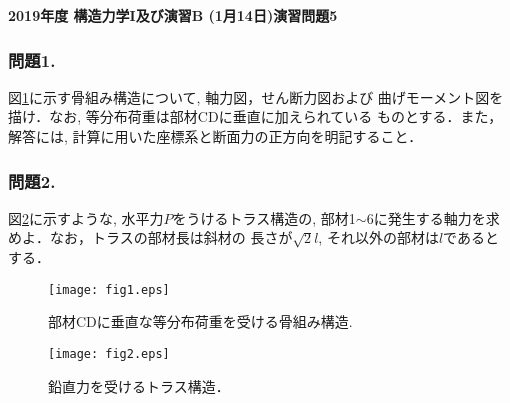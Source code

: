 \documentclass[10pt,a4j]{jarticle}
\newlength{\minitwocolumn}
\begin{document}
\newcommand{\fat}[1]{\mbox{\boldmath $#1$}}
\newcommand{\D}{\partial}
\newcommand{\w}{\omega}
\newcommand{\ga}{\alpha}
\newcommand{\gb}{\beta}
\newcommand{\gx}{\xi}
\newcommand{\gz}{\zeta}
\newcommand{\vhat}[1]{\hat{\fat{#1}}}
\newcommand{\spc}{\vspace{0.7\baselineskip}}
\newcommand{\halfspc}{\vspace{0.3\baselineskip}}

\pagestyle{empty}
\newcommand{\twofig}[2]
 {
   \begin{figure}[h]
     \begin{minipage}[t]{\minitwocolumn}
         \begin{center}   #1
         \end{center}
     \end{minipage}
         \hspace{\columnsep}
     \begin{minipage}[t]{\minitwocolumn}
         \begin{center} #2
         \end{center}
     \end{minipage}
   \end{figure}
 }
\begin{center}
{\Large \bf 2019年度 構造力学I及び演習B (1月14日)演習問題5} \\
\end{center}
\subsubsection*{問題1.}
図\ref{fig:fig1}に示す骨組み構造について, 軸力図，せん断力図および
曲げモーメント図を描け．なお, 等分布荷重は部材CDに垂直に加えられている
ものとする．また，解答には, 計算に用いた座標系と断面力の正方向を明記すること．
\subsubsection*{問題2.}
図\ref{fig:fig2}に示すような, 水平力$P$をうけるトラス構造の, 
部材1$\sim$6に発生する軸力を求めよ．なお，トラスの部材長は斜材の
長さが$\sqrt{2}l$, それ以外の部材は$l$であるとする．
\begin{figure}[h]
	\begin{center}
	\texttt{[image: fig1.eps]} 
	\end{center}
	\caption{部材CDに垂直な等分布荷重を受ける骨組み構造.}
	\label{fig:fig1}
\end{figure}
\begin{figure}[h]
	\begin{center}
	\texttt{[image: fig2.eps]} 
	\end{center}
	\caption{鉛直力を受けるトラス構造．} 
	\label{fig:fig2}
\end{figure}
\end{document}
